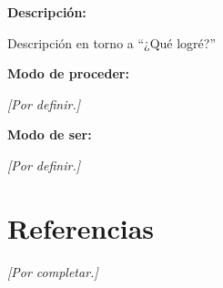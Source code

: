 \documentclass[12pt,a4paper]{article}
\newcommand{\placeholder}[1]{
	\textit{\textcolor{secondary}{[#1]}}
}
\begin{document}
	\textbf{Descripción:}
	
	Descripción en torno a ``¿Qué logré?''
	
	\vspace{0.3cm}
	
	\textbf{Modo de proceder:}
	
	\placeholder{Por definir.}
	
	\textbf{Modo de ser:}
	
	\placeholder{Por definir.}
	
	
	\section*{Referencias}
	
	\placeholder{Por completar.}
	
\end{document}
